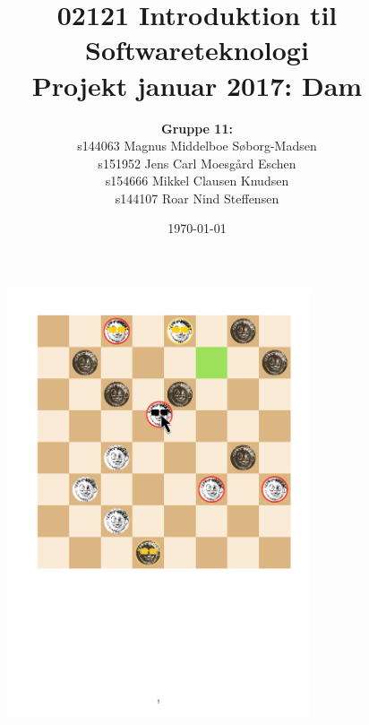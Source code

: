 


\title{02121 Introduktion til Softwareteknologi \\ Projekt januar 2017: Dam}
\author{\textbf{Gruppe 11:} \\ 
s144063	Magnus Middelboe Søborg-Madsen \\
s151952	Jens Carl Moesgård Eschen \\
s154666	Mikkel Clausen Knudsen \\
s144107	Roar Nind Steffensen}
\date{\today}




\maketitle

\begin{figure}[H]
    \centering
    \includegraphics[width = 0.8\textwidth]{Figurer/Forside}
\end{figure}

\vspace{0.5 cm}


